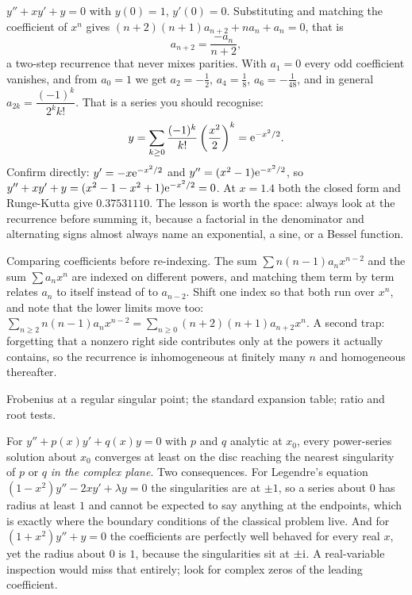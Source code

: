 \begin{worked}
$y''+xy'+y=0$ with $y(0)=1$, $y'(0)=0$. Substituting and matching the coefficient of $x^{n}$ gives $(n+2)(n+1)a_{n+2}+na_n+a_n=0$, that is
\[a_{n+2}=\frac{-a_n}{n+2},\]
a two-step recurrence that never mixes parities. With $a_1=0$ every odd coefficient vanishes, and from $a_0=1$ we get $a_2=-\tfrac12$, $a_4=\tfrac18$, $a_6=-\tfrac1{48}$, and in general $a_{2k}=\dfrac{(-1)^{k}}{2^{k}k!}$. That is a series you should recognise:
\[y=\sum_{k\ge0}\frac{(-1)^{k}}{k!}\left(\frac{x^{2}}{2}\right)^{k}=\mathrm{e}^{-x^{2}/2}.\]
Confirm directly: $y'=-x\mathrm{e}^{-x^{2}/2}$ and $y''=(x^{2}-1)\mathrm{e}^{-x^{2}/2}$, so $y''+xy'+y=(x^{2}-1-x^{2}+1)\mathrm{e}^{-x^{2}/2}=0$. At $x=1.4$ both the closed form and Runge-Kutta give $0.37531110$. The lesson is worth the space: always look at the recurrence before summing it, because a factorial in the denominator and alternating signs almost always name an exponential, a sine, or a Bessel function.
\end{worked}

\begin{trap}
Comparing coefficients before re-indexing. The sum $\sum n(n-1)a_nx^{n-2}$ and the sum $\sum a_nx^{n}$ are indexed on different powers, and matching them term by term relates $a_n$ to itself instead of to $a_{n-2}$. Shift one index so that both run over $x^{n}$, and note that the lower limits move too: $\sum_{n\ge2}n(n-1)a_nx^{n-2}=\sum_{n\ge0}(n+2)(n+1)a_{n+2}x^{n}$. A second trap: forgetting that a nonzero right side contributes only at the powers it actually contains, so the recurrence is inhomogeneous at finitely many $n$ and homogeneous thereafter.
\end{trap}

\begin{seealsob}Frobenius at a regular singular point; the standard expansion table; ratio and root tests.\end{seealsob}

\begin{keynote}
For $y''+p(x)y'+q(x)y=0$ with $p$ and $q$ analytic at $x_0$, every power-series solution about $x_0$ converges at least on the disc reaching the nearest singularity of $p$ or $q$ \emph{in the complex plane}. Two consequences. For Legendre's equation $(1-x^{2})y''-2xy'+\lambda y=0$ the singularities are at $\pm1$, so a series about $0$ has radius at least $1$ and cannot be expected to say anything at the endpoints, which is exactly where the boundary conditions of the classical problem live. And for $(1+x^{2})y''+y=0$ the coefficients are perfectly well behaved for every real $x$, yet the radius about $0$ is $1$, because the singularities sit at $\pm\mathrm{i}$. A real-variable inspection would miss that entirely; look for complex zeros of the leading coefficient.
\end{keynote}

